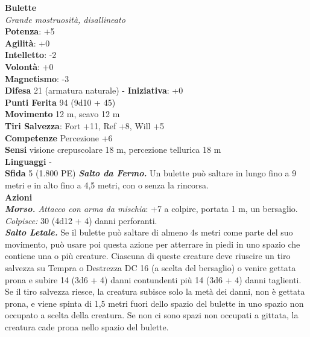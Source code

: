 \begin{multicols}{2}
\medskip\textbf{Bulette}\\
\emph{Grande mostruosità, disallineato}\\
\textbf{Potenza}: +5\\
\textbf{Agilità}: +0\\
\textbf{Intelletto}: -2\\
\textbf{Volontà}: +0\\
\textbf{Magnetismo}: -3\\
\textbf{Difesa} 21 (armatura naturale) - \textbf{Iniziativa}: +0\\
\textbf{Punti Ferita} 94 (9d10 + 45)\\
\textbf{Movimento} 12 m, scavo 12 m\\
\textbf{Tiri Salvezza}: Fort +11, Ref +8, Will +5\\
\textbf{Competenze} Percezione +6\\
\textbf{Sensi} visione crepuscolare 18 m, percezione tellurica 18 m\\
\textbf{Linguaggi} -\\
\textbf{Sfida} 5 (1.800 PE)\smallskip
\emph{\textbf{Salto da Fermo.}} Un bulette può saltare in lungo fino a 9 metri e in alto fino a 4,5 metri, con o senza la rincorsa.\\
\smallskip\textbf{Azioni}\\
\emph{\textbf{Morso.} Attacco con arma da mischia}: +7 a colpire, portata 1 m, un bersaglio.\\
\emph{Colpisce:} 30 (4d12 + 4) danni perforanti.\\
\emph{\textbf{Salto Letale.}} Se il bulette può saltare di almeno 4s metri come parte del suo movimento, può usare poi questa azione per atterrare in piedi in uno spazio che contiene una o più creature. Ciascuna di queste creature deve riuscire un tiro salvezza su Tempra o Destrezza DC 16 (a scelta del bersaglio) o venire gettata prona e subire 14 (3d6 + 4) danni contundenti più 14 (3d6 + 4) danni taglienti. Se il tiro salvezza riesce, la creatura subisce solo la metà dei danni, non è gettata prona, e viene spinta di 1,5 metri fuori dello spazio del bulette in uno spazio non occupato a scelta della creatura. Se non ci sono spazi non occupati a gittata, la creatura cade prona nello spazio del bulette.\\


\end{multicols}
